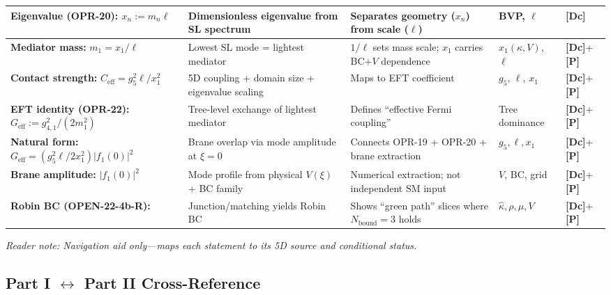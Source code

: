 \begin{tcolorbox}[breakable, enhanced, title={5D Origin Audit Table --- from 5D cause to 3D shadow (no new claims)}, colback=white, colframe=black, left=1mm, right=1mm, boxsep=1mm, width=\linewidth]
\begin{tabularx}{\linewidth}{@{}>{\raggedright\arraybackslash}p{2cm} >{\raggedright\arraybackslash}X >{\raggedright\arraybackslash}X >{\raggedright\arraybackslash}p{1.5cm} >{\raggedright\arraybackslash}p{1.5cm}@{}}
\textbf{Eigenvalue (OPR-20):} $x_n := m_n \ell$ &
Dimensionless eigenvalue from SL spectrum &
Separates geometry ($x_n$) from scale ($\ell$) &
BVP, $\ell$ &
\textbf{[Dc]} \\
\midrule

\textbf{Mediator mass:} $m_1 = x_1/\ell$ &
Lowest SL mode = lightest mediator &
$1/\ell$ sets mass scale; $x_1$ carries BC+$V$ dependence &
$x_1(\kappa,V)$, $\ell$ &
\textbf{[Dc]}+\textbf{[P]} \\
\midrule

\textbf{Contact strength:} $C_{\text{eff}} = g_5^2\ell/x_1^2$ &
5D coupling + domain size + eigenvalue scaling &
Maps to EFT coefficient &
$g_5$, $\ell$, $x_1$ &
\textbf{[Dc]}+\textbf{[P]} \\
\midrule

\textbf{EFT identity (OPR-22):} $G_{\text{eff}} := g_{4,1}^2/(2m_1^2)$ &
Tree-level exchange of lightest mediator &
Defines ``effective Fermi coupling'' &
Tree dominance &
\textbf{[Dc]}+\textbf{[P]} \\
\midrule

\textbf{Natural form:} $G_{\text{eff}} = (g_5^2\ell/2x_1^2)|f_1(0)|^2$ &
Brane overlap via mode amplitude at $\xi=0$ &
Connects OPR-19 + OPR-20 + brane extraction &
$g_5,\ell,x_1$ &
\textbf{[Dc]}+\textbf{[P]} \\
\midrule

\textbf{Brane amplitude:} $|f_1(0)|^2$ &
Mode profile from physical $V(\xi)$ + BC family &
Numerical extraction; not independent SM input &
$V$, BC, grid &
\textbf{[Dc]}+\textbf{[P]} \\
\midrule

\textbf{Robin BC (OPEN-22-4b-R):} &
Junction/matching yields Robin BC &
Shows ``green path'' slices where $N_{\text{bound}}=3$ holds &
$\hat\kappa,\rho,\mu,V$ &
\textbf{[Dc]}+\textbf{[P]} \\
\bottomrule
\end{tabularx}

\vspace{4pt}
\textit{Reader note: Navigation aid only---maps each statement to its 5D source and conditional status.}
\end{tcolorbox}


\subsection{Part I $\leftrightarrow$ Part II Cross-Reference}
\label{sec:ch20_part1_part2_xref}


